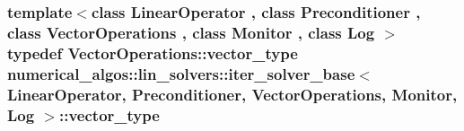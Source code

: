 \hypertarget{classnumerical__algos_1_1lin__solvers_1_1iter__solver__base_a474414aa5d9e2b387f48a6bf182c47eb}{
\subsubsection[{vector\-\_\-type}]{\setlength{\rightskip}{0pt plus 5cm}template$<$class Linear\-Operator , class Preconditioner , class Vector\-Operations , class Monitor , class Log $>$ typedef Vector\-Operations\-::vector\-\_\-type {\bf numerical\-\_\-algos\-::lin\-\_\-solvers\-::iter\-\_\-solver\-\_\-base}$<$ Linear\-Operator, Preconditioner, Vector\-Operations, Monitor, Log $>$\-::{\bf vector\-\_\-type}}}\label{classnumerical__algos_1_1lin__solvers_1_1iter__solver__base_a474414aa5d9e2b387f48a6bf182c47eb}



